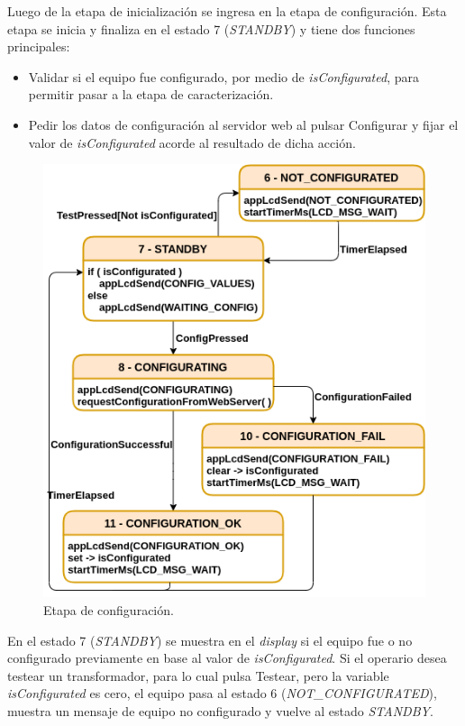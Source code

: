 Luego de la etapa de inicialización se ingresa en la etapa de configuración. Esta etapa se inicia y finaliza en el estado 7 (\textit{STANDBY}) y tiene dos funciones principales:

\begin{itemize}
\item Validar si el equipo fue configurado, por medio de \textit{isConfigurated}, para permitir pasar a la etapa de caracterización.
\item Pedir los datos de configuración al servidor web al pulsar Configurar y fijar el valor de \textit{isConfigurated} acorde al resultado de dicha acción.
\end{itemize}



\begin{figure}[ht]
	\centering
	\includegraphics[scale=1]{./Figures/MainFSM_2.png}
	\caption{Etapa de configuración.}
	\label{fig:MainFSM_2}
\end{figure}

En el estado 7 (\textit{STANDBY}) se muestra en el \textit{display} si el equipo fue o no configurado previamente en base al valor de \textit{isConfigurated}. Si el operario desea testear un transformador, para lo cual pulsa Testear, pero la variable \textit{isConfigurated} es cero, el equipo pasa al estado 6 (\textit{NOT\_CONFIGURATED}), muestra un mensaje de equipo no configurado y vuelve al estado \textit{STANDBY}.

